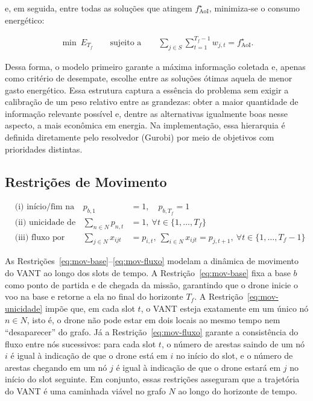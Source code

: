 \documentclass[
    12pt,
    oneside,
    a4paper,
    brazil
]{abntex2}
\begin{document}
    e, em seguida, entre todas as soluções que atingem $f_{\text{AoI}}^{\star}$, minimiza-se o consumo energético:

    \begin{align}
        \min\ E_{T_f}
        \qquad \text{sujeito a} \qquad
        \sum_{j \in S}\sum_{t=1}^{T_f-1} w_{j,t} = f_{\text{AoI}}^{\star}.
        \label{eq:objetivo-energia}
    \end{align}

    Dessa forma, o modelo primeiro garante a máxima informação coletada e, apenas como critério de desempate, escolhe entre as soluções ótimas aquela de menor gasto energético. Essa estrutura captura a essência do problema sem exigir a calibração de um peso relativo entre as grandezas: obter a maior quantidade de informação relevante possível e, dentre as alternativas igualmente boas nesse aspecto, a mais econômica em energia. Na implementação, essa hierarquia é definida diretamente pelo resolvedor (Gurobi) por meio de objetivos com prioridades distintas.

    \subsection{Restrições de Movimento}

    \begin{align}
      &\text{(i) início/fim na base:}& p_{b,1}&=1,\quad p_{b,T_f}=1 \label{eq:mov-base}\\
      &\text{(ii) unicidade de posição:}& \sum_{n\in N} p_{n,t} &= 1,\ \forall t\in\{1,\ldots,T_f\} \label{eq:mov-unicidade}\\
      &\text{(iii) fluxo por slot:}& \sum_{j\in N} x_{i j t} &= p_{i,t},\ \sum_{i\in N} x_{i j t} = p_{j,t+1},\ \forall t\in\{1,\ldots,T_f-1\} \label{eq:mov-fluxo}
    \end{align}

    As Restrições~\eqref{eq:mov-base}--\eqref{eq:mov-fluxo} modelam a dinâmica de movimento do VANT ao longo dos slots de tempo. A Restrição~\eqref{eq:mov-base} fixa a base $b$ como ponto de partida e de chegada da missão, garantindo que o drone inicie o voo na base e retorne a ela no final do horizonte $T_f$. A Restrição~\eqref{eq:mov-unicidade} impõe que, em cada slot $t$, o VANT esteja exatamente em um único nó $n \in N$, isto é, o drone não pode estar em dois locais ao mesmo tempo nem ``desaparecer'' do grafo. Já a Restrição~\eqref{eq:mov-fluxo} garante a consistência do fluxo entre nós sucessivos: para cada slot $t$, o número de arestas saindo de um nó $i$ é igual à indicação de que o drone está em $i$ no início do slot, e o número de arestas chegando em um nó $j$ é igual à indicação de que o drone estará em $j$ no início do slot seguinte. Em conjunto, essas restrições asseguram que a trajetória do VANT é uma caminhada viável no grafo $N$ ao longo do horizonte de tempo.
\end{document}
